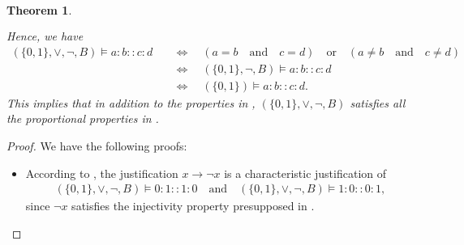 \documentclass[11pt]{amsart}
\newtheorem{theorem}{Theorem}
\theoremstyle{definition} %
\begin{document}
\begin{theorem}
\begin{align*}
\begin{array}{cccc||c|c}
\end{array}
\end{align*} Hence, we have
\begin{align}\label{equ:BlornegB_models_} 
	(\{0,1\},\lor,\neg,B)\models a:b::c:d \quad&\Leftrightarrow\quad (a=b \quad\text{and}\quad c=d)\quad\text{or}\quad(a\neq b \quad\text{and}\quad c\neq d)\\ 
		\quad&\Leftrightarrow\quad (\{0,1\},\neg,B)\models a:b::c:d\\
		\quad&\Leftrightarrow\quad (\{0,1\})\models a:b::c:d.
\end{align} This implies that in addition to the properties in , $(\{0,1\},\lor,\neg,B)$ satisfies all the proportional properties in .
\end{theorem}
\begin{proof} We have the following proofs:
\begin{itemize}
	\item According to , the justification $x\to\neg x$ is a characteristic justification of
	\begin{align}\label{equ:BlornegB_models_0110_1001} 
		(\{0,1\},\lor,\neg,B)\models 0:1::1:0 \quad\text{and}\quad (\{0,1\},\lor,\neg,B)\models 1:0::0:1,
	\end{align} since $\neg x$ satisfies the injectivity property presupposed in .


\end{itemize}
\end{proof}
\end{document}

